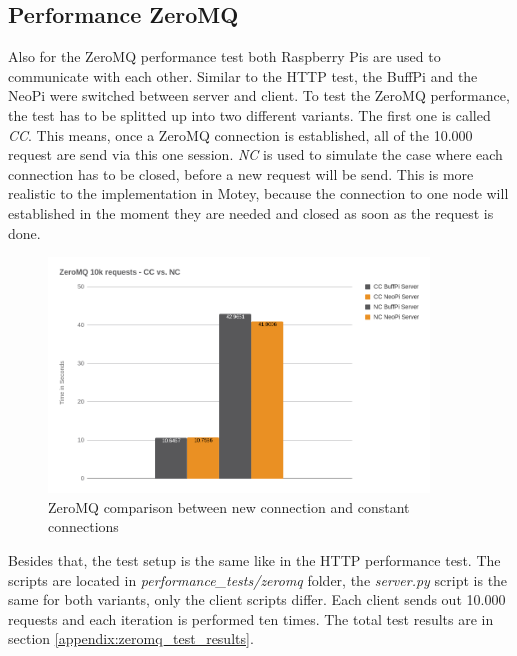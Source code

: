\subsection{Performance ZeroMQ}
Also for the ZeroMQ performance test both Raspberry Pis are used to communicate with each other.
Similar to the \ac{HTTP} test, the BuffPi and the NeoPi were switched between server and client.
To test the ZeroMQ performance, the test has to be splitted up into two different variants.
The first one is called \textit{\ac{CC}}.
This means, once a ZeroMQ connection is established, all of the 10.000 request are send via this one session.
\textit{\ac{NC}} is used to simulate the case where each connection has to be closed, before a new request will be send.
This is more realistic to the implementation in Motey, because the connection to one node will established in the moment they are needed and closed as soon as the request is done.

\begin{figure}[H]
    \centering
    \includegraphics[width=0.9\textwidth]{resources/images/performance_zeromq_cc_vs_nc.png}
    \caption[ZeroMQ comparison between new connection and constant connections]{ZeroMQ comparison between new connection and constant connections}
    \label{fig:performance_zeromq_cc_vs_nc}
\end{figure}

Besides that, the test setup is the same like in the \ac{HTTP} performance test.
The scripts are located in \textit{performance\_tests/zeromq} folder, the \textit{server.py} script is the same for both variants, only the client scripts differ.
Each client sends out 10.000 requests and each iteration is performed ten times.
The total test results are in section \ref{appendix:zeromq_test_results}.\newline

